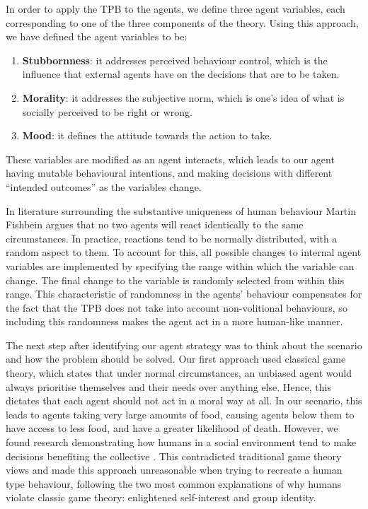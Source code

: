 In order to apply the TPB to the agents, we define three agent variables, each corresponding to one of the three components of the theory. Using this approach, we have defined the agent variables to be: 
\begin{enumerate}
    \item \textbf{Stubbornness}: it addresses perceived behaviour control, which is the influence that external agents have on the decisions that are to be taken.
    \item \textbf{Morality}: it addresses the subjective norm, which is one's idea of what is socially perceived to be right or wrong.
    \item \textbf{Mood}: it defines the attitude towards the action to take.
\end{enumerate}
These variables are modified as an agent interacts, which leads to our agent having mutable behavioural intentions, and making decisions with different “intended outcomes” as the variables change. \par
In literature surrounding the substantive uniqueness of human behaviour \cite{TRA} Martin Fishbein argues that no two agents will react identically to the same circumstances. In practice, reactions tend to be normally distributed, with a random aspect to them. To account for this, all possible changes to  internal agent variables are implemented by specifying the range within which the variable can change. The final change to the variable is randomly selected from within this range. This characteristic of randomness in the agents’ behaviour compensates for the fact that the TPB does not take into account non-volitional behaviours, so including this randomness makes the agent act in a more human-like manner.\par 
The next step after identifying our agent strategy was to think about the scenario and how the problem should be solved. Our first approach used classical game theory, which states that under normal circumstances, an unbiased agent would always prioritise themselves and their needs over anything else. Hence, this dictates that each agent should not act in a moral way at all. In our scenario, this leads to agents taking very large amounts of food, causing agents below them to have access to less food, and have a greater likelihood of death. However, we found research demonstrating how humans in a social environment tend to make decisions benefiting the collective \cite{batson_batson_todd_brummett_shaw_aldeguer_1995}. This contradicted traditional game theory views and made this approach unreasonable when trying to recreate a human type behaviour, following the two most common explanations of why humans violate classic game theory: enlightened self-interest and group identity.\par 
